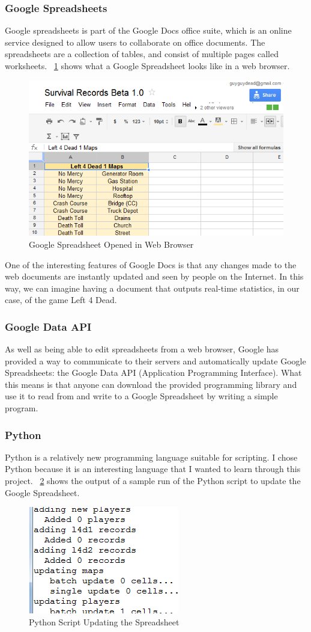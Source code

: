 \subsubsection{Google Spreadsheets}
Google spreadsheets is part of the Google Docs office suite, which is an online service designed to allow users to collaborate on office documents. The spreadsheets are a collection of tables, and consist of multiple pages called worksheets. \figurename\ \ref{fig:sample1} shows what a Google Spreadsheet looks like in a web browser.
\begin{figure}[htb!]
\centering
\includegraphics[width=0.40\columnwidth]{sample_screen_1}
\caption{Google Spreadsheet Opened in Web Browser}
\label{fig:sample1}
\end{figure}

One of the interesting features of Google Docs is that any changes made to the web documents are instantly updated and seen by people on the Internet. In this way, we can imagine having a document that outputs real-time statistics, in our case, of the game Left 4 Dead.

\subsubsection{Google Data API}
As well as being able to edit spreadsheets from a web browser, Google has provided a way to communicate to their servers and automatically update Google Spreadsheets: the Google Data API (Application Programming Interface). What this means is that anyone can download the provided programming library and use it to read from and write to a Google Spreadsheet by writing a simple program.

\subsubsection{Python}
Python is a relatively new programming language suitable for scripting. I chose Python because it is an interesting language that I wanted to learn through this project. \figurename\ \ref{fig:sample2} shows the output of a sample run of the Python script to update the Google Spreadsheet.
\begin{figure}[htb!]
\centering
\includegraphics[width=0.30\columnwidth]{sample_screen_2}
\caption{Python Script Updating the Spreadsheet}
\label{fig:sample2}
\end{figure}

